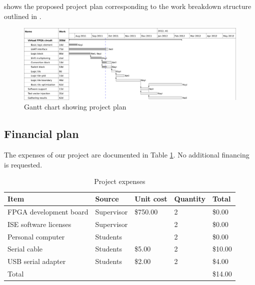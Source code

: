  shows the proposed project plan corresponding to the work breakdown structure outlined in .

\begin{figure}[!h]
	\centering
	\includegraphics[scale=0.8]{gantt.png}
	\caption{Gantt chart showing project plan}
	\label{gantt-chart}
\end{figure}


\subsection{Financial plan} %


The expenses of our project are documented in Table \ref{expenses-table}.
No additional financing is requested.

\begin{table}[!h]
	\centering
	\begin{tabular}{ | l | l | l | l | l | }
		\hline
		\textbf{Item} & \textbf{Source} & \textbf{Unit cost} & \textbf{Quantity} & \textbf{Total} \\
		\hline \hline
		FPGA development board & Supervisor & \$750.00 & 2 & \$0.00 \\
		ISE software licenses & Supervisor & & 2 & \$0.00 \\
		Personal computer & Students & & 2 & \$0.00 \\
		Serial cable & Students & \$5.00 & 2 & \$10.00 \\
		USB serial adapter & Students & \$2.00 & 2 & \$4.00 \\
		\hline
		Total & & & & \$14.00 \\
		\hline
	\end{tabular}
	\caption{Project expenses}
	\label{expenses-table}
\end{table}


